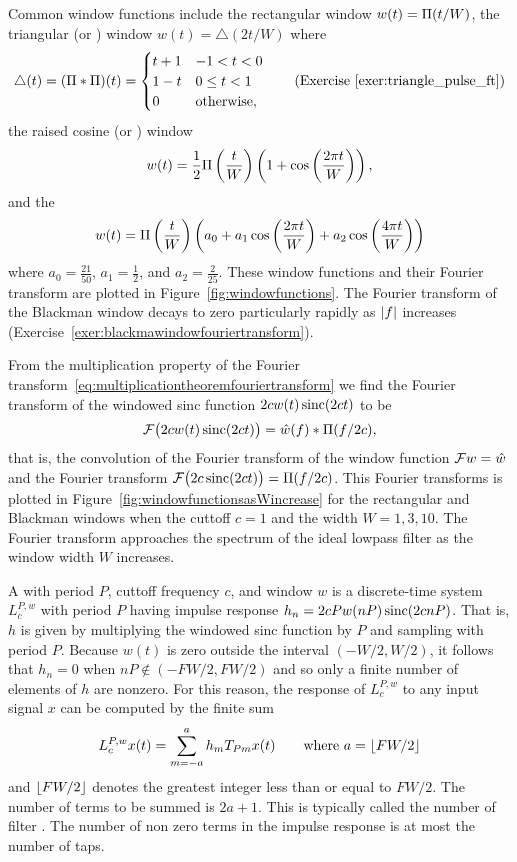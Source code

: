 Common window functions include the rectangular window $w(t) = \Pi(t/W)$, the triangular (or ) window $w(t) = \bigtriangleup(2t/W)$ where 
\[
\bigtriangleup(t) = (\Pi * \Pi)(t)  = \begin{cases}
t + 1 & -1 < t < 0 \\
1 - t & 0 \leq t < 1 \\
0 & \text{otherwise}, 
\end{cases} \qquad \text{(Exercise~\ref{exer:triangle_pulse_ft})}
\]
the raised cosine (or ) window
\[
w(t)  = \frac{1}{2} \Pi\left(\frac{t}{W}\right)\left( 1 + \cos\left(\frac{2\pi t}{W}\right) \right),
\]
and the ~\citep{BlackmanTukeywindows}
\begin{equation}\label{eq:blackmanwindow}
w(t) = \Pi\left(\frac{t}{W}\right) \left( a_0 + a_1 \cos\left(\frac{2\pi t}{W}\right) + a_2 \cos\left(\frac{4\pi t}{W}\right) \right) 
\end{equation}
where $a_0 = \tfrac{21}{50}$, $a_1 = \tfrac{1}{2}$, and $a_2 = \tfrac{2}{25}$.  These window functions and their Fourier transform are plotted in Figure~\ref{fig:windowfunctions}.  The Fourier transform of the Blackman window decays to zero particularly rapidly as $\left\vert f \right\vert$ increases (Exercise~\ref{exer:blackmawindowfouriertransform}).

From the multiplication property of the Fourier transform~\eqref{eq:multiplicationtheoremfouriertransform} we find the Fourier transform of the windowed sinc function $2c w(t) \operatorname{sinc}(2ct)$ to be
\[
{\mathcal F}\big( 2c w(t) \operatorname{sinc}(2ct)  \big) = \hat{w}(f) * \Pi(f/2c),
\]
that is, the convolution of the Fourier transform of the window function ${\mathcal F} w = \hat{w}$ and the Fourier transform ${\mathcal F}\big( 2c\operatorname{sinc}(2ct) \big) = \Pi(f/2c)$.
This Fourier transforms is plotted in Figure~\ref{fig:windowfunctionsasWincrease} for the rectangular and Blackman windows when the cuttoff $c = 1$ and the width $W=1,3,10$.  The Fourier transform approaches the spectrum of the ideal lowpass filter as the window width $W$ increases.

A  with period $P$, cuttoff frequency $c$, and window $w$ is a discrete-time system $L_c^{P,w}$ with period $P$ having impulse response $h_n = 2c P w(nP) \operatorname{sinc}(2c nP)$.  That is, $h$ is given by multiplying the windowed sinc function by $P$ and sampling with period $P$.  Because $w(t)$ is zero outside the interval $(-W/2, W/2)$, it follows that $h_n = 0$ when $n P \notin (-FW/2, FW/2)$ and so only a finite number of elements of $h$ are nonzero.  For this reason, the response of $L_c^{P,w}$ to any input signal $x$ can be computed by the finite sum
\[
L_c^{P,w}x(t) = \sum_{m = -a}^a h_m T_{Pm}x(t) \qquad \text{where $a = {\left\lfloor FW/2 \right\rfloor}$}
\]
and ${\left\lfloor FW/2 \right\rfloor}$ denotes the greatest integer less than or equal to $FW/2$.  The number of terms to be summed is $2a + 1$.  This is typically called the number of filter .  The number of non zero terms in the impulse response is at most the number of taps.  

